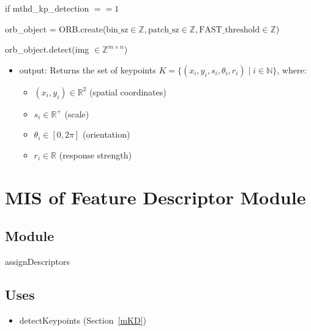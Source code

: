 \documentclass[12pt, titlepage]{article}
\begin{document}
if mthd\_kp\_detection $== 1$ \newline

orb\_object = ORB.create($\text{bin\_sz}\in \mathbb{Z}, \text{patch\_sz}\in 
\mathbb{Z}, \text{FAST\_threshold} \in \mathbb{Z}$) \newline

orb\_object.detect(img $\in \mathbb{Z}^{m \times n}$)
\begin{itemize}
  \item output: Returns the set of keypoints \( K = \{ (x_i, y_i, s_i, \theta_i, r_i) \mid i \in \mathbb{N} \} \), where:
  \begin{itemize}
      \item \( (x_i, y_i) \in \mathbb{R}^2 \) (spatial coordinates)
      \item \( s_i \in \mathbb{R}^+ \) (scale)
      \item \( \theta_i \in [0, 2\pi] \) (orientation)
      \item \( r_i \in \mathbb{R} \) (response strength)
  \end{itemize}
\end{itemize}





\section{MIS of Feature Descriptor Module} \label{mFD}



\subsection{Module}

assignDescriptors

\subsection{Uses}
\begin{itemize}
  \item detectKeypoints (Section~\ref{mKD})
\end{itemize}
\end{document}

